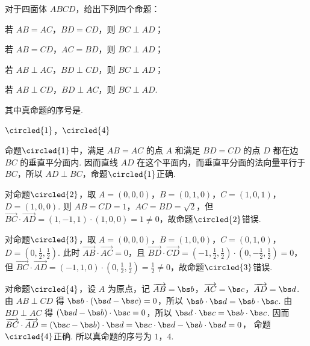 \begin{problem}
对于四面体 \(ABCD\)，给出下列四个命题：

\begin{circlelist}
\item 若 \(AB=AC\)，\(BD=CD\)，则 \(BC \perp AD\)；
\item 若 \(AB=CD\)，\(AC=BD\)，则 \(BC \perp AD\)；
\item 若 \(AB \perp AC\)，\(BD \perp CD\)，则 \(BC \perp AD\)；
\item 若 \(AB \perp CD\)，\(BD \perp AC\)，则 \(BC \perp AD\).
\end{circlelist}

其中真命题的序号是\fillinblank{}.
\begin{answer}
\(\circled{1}\)，\(\circled{4}\)
\end{answer}

\begin{solution}
命题\(\circled{1}\)中，满足 \(AB=AC\) 的点 \(A\) 和满足 \(BD=CD\) 的点 \(D\) 都在边 \(BC\) 的垂直平分面内. 因而直线 \(AD\) 在这个平面内，而垂直平分面的法向量平行于 \(BC\)，所以 \(AD\perp BC\)，命题\(\circled{1}\)正确.

对命题\(\circled{2}\)，取
\(A=(0,0,0)\)，\(B=(0,1,0)\)，\(C=(1,0,1)\)，\(D=(1,0,0)\). 则 \(AB=CD=1\)，\(AC=BD=\sqrt{2}\)，但 \(\overrightarrow{BC}\cdot\overrightarrow{AD}=(1,-1,1)\cdot(1,0,0)=1\neq0\)，故命题\(\circled{2}\)错误.

对命题\(\circled{3}\)，取
\(A=(0,0,0)\)，\(B=(1,0,0)\)，\(C=(0,1,0)\)，\(D=\left(0,\frac{1}{2},\frac{1}{2}\right)\). 此时 \(\overrightarrow{AB}\cdot\overrightarrow{AC}=0\)，且
\(\overrightarrow{BD}\cdot\overrightarrow{CD}=(-1,\tfrac{1}{2},\tfrac{1}{2})\cdot(0,-\tfrac{1}{2},\tfrac{1}{2})=0\)，
但 \(\overrightarrow{BC}\cdot\overrightarrow{AD}=(-1,1,0)\cdot\left(0,\frac{1}{2},\frac{1}{2}\right)=\frac{1}{2}\neq0\)，故命题\(\circled{3}\)错误.

对命题\(\circled{4}\)，设 \(A\) 为原点，记 \(\overrightarrow{AB}=\bs b\)，\(\overrightarrow{AC}=\bs c\)，\(\overrightarrow{AD}=\bs d\). 由 \(AB\perp CD\) 得 \(\bs b\cdot(\bs d-\bs c)=0\)，所以 \(\bs b\cdot\bs d=\bs b\cdot\bs c\). 由 \(BD\perp AC\) 得 \((\bs d-\bs b)\cdot\bs c=0\)，所以 \(\bs d\cdot\bs c=\bs b\cdot\bs c\). 因而
\(\overrightarrow{BC}\cdot\overrightarrow{AD}=(\bs c-\bs b)\cdot\bs d=\bs c\cdot\bs d-\bs b\cdot\bs d=0\)，
命题\(\circled{4}\)正确. 所以真命题的序号为 \(1\)，\(4\).
\end{solution}
\end{problem}

